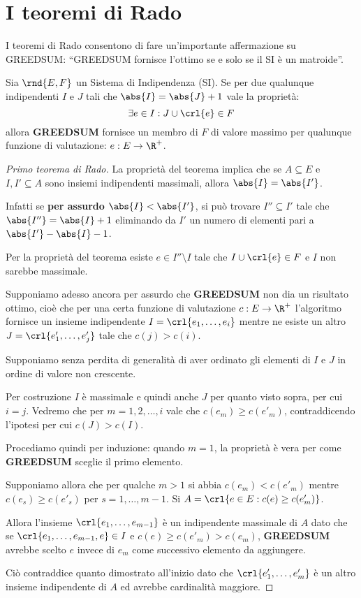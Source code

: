 \documentclass[\main/main.tex]{subfiles}
\begin{document}
\section{I teoremi di Rado}
I teoremi di Rado consentono di fare un'importante affermazione su GREEDSUM: ``GREEDSUM fornisce l'ottimo se e solo se il SI è un matroide''.
\begin{theorem}
  Sia \(\rnd{E, F}\) un Sistema di Indipendenza (SI). Se per due qualunque indipendenti \(I\) e \(J\) tali che \(\abs{I} = \abs{J} + 1\) vale la proprietà:
  \[
    \exists e \in I: J \cup \crl{e} \in F
  \]
  allora \textbf{GREEDSUM} fornisce un membro di \(F\) di valore massimo per qualunque funzione di valutazione: \(e: E \rightarrow \R^+\).
  \label{primo_rado}
\end{theorem}
\begin{proof}[Primo teorema di Rado]
  La proprietà del teorema implica che se \(A \subseteq E\) e \(I, I' \subseteq A\) sono insiemi indipendenti massimali, allora \(\abs{I} = \abs{I'}\).

  Infatti se \textbf{per assurdo} \(\abs{I} < \abs{I'}\), si può trovare \(I'' \subseteq I'\) tale che \(\abs{I''} = \abs{I} + 1\) eliminando da \(I'\) un numero di elementi pari a \(\abs{I'} - \abs{I} - 1\).

  Per la proprietà del teorema esiste \(e \in I'' \setminus I\) tale che \(I \cup \crl{e} \in F\) e \(I\) non sarebbe massimale.

  Supponiamo adesso ancora per assurdo che \textbf{GREEDSUM} non dia un risultato ottimo, cioè che per una certa funzione di valutazione \(c: E \rightarrow \R^+\) l'algoritmo fornisce un insieme indipendente \(I = \crl{e_1, \ldots, e_i}\) mentre ne esiste un altro \(J = \crl{e'_1, \ldots, e'_j}\) tale che \(c(j) > c(i)\).

  Supponiamo senza perdita di generalità di aver ordinato gli elementi di \(I\) e \(J\) in ordine di valore non crescente.

  Per costruzione \(I\) è massimale e quindi anche \(J\) per quanto visto sopra, per cui \(i=j\). Vedremo che per \(m=1, 2, \ldots, i\) vale che \(c(e_m) \geq c(e'_m)\), contraddicendo l'ipotesi per cui \(c(J) > c(I)\).

  Procediamo quindi per induzione: quando \(m=1\), la proprietà è vera per come \textbf{GREEDSUM} sceglie il primo elemento.

  Supponiamo allora che per qualche \(m>1\) si abbia \(c(e_m) < c(e'_m)\) mentre \(c(e_s) \geq c(e'_s)\) per \(s = 1, \ldots, m-1\). Si \(A = \crl{e \in E: c(e) \geq c(e'_m)}\).

  Allora l'insieme \(\crl{e_1, \ldots, e_{m-1}}\) è un indipendente massimale di \(A\) dato che se \(\crl{e_1, \ldots, e_{m-1}, e} \in I\) e \(c(e) \geq c(e'_m) > c(e_m)\), \textbf{GREEDSUM} avrebbe scelto \(e\) invece di \(e_m\) come successivo elemento da aggiungere.

  Ciò contraddice quanto dimostrato all'inizio dato che \(\crl{e'_1, \ldots, e'_m}\) è un altro insieme indipendente di \(A\) ed avrebbe cardinalità maggiore.
\end{proof}
\end{document}
